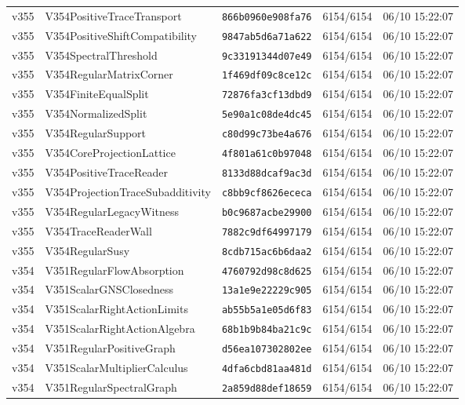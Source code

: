 \documentclass[11pt]{article}
\theoremstyle{definition}\newtheorem{deriv}{Derivation}
\begin{document}
{\begin{longtable}{@{}lllll@{}}
v355 & V354PositiveTraceTransport & \texttt{866b0960e908fa76} & 6154/6154 & 06/10 15:22:07 \\
v355 & V354PositiveShiftCompatibility & \texttt{9847ab5d6a71a622} & 6154/6154 & 06/10 15:22:07 \\
v355 & V354SpectralThreshold & \texttt{9c33191344d07e49} & 6154/6154 & 06/10 15:22:07 \\
v355 & V354RegularMatrixCorner & \texttt{1f469df09c8ce12c} & 6154/6154 & 06/10 15:22:07 \\
v355 & V354FiniteEqualSplit & \texttt{72876fa3cf13dbd9} & 6154/6154 & 06/10 15:22:07 \\
v355 & V354NormalizedSplit & \texttt{5e90a1c08de4dc45} & 6154/6154 & 06/10 15:22:07 \\
v355 & V354RegularSupport & \texttt{c80d99c73be4a676} & 6154/6154 & 06/10 15:22:07 \\
v355 & V354CoreProjectionLattice & \texttt{4f801a61c0b97048} & 6154/6154 & 06/10 15:22:07 \\
v355 & V354PositiveTraceReader & \texttt{8133d88dcaf9ac3d} & 6154/6154 & 06/10 15:22:07 \\
v355 & V354ProjectionTraceSubadditivity & \texttt{c8bb9cf8626ececa} & 6154/6154 & 06/10 15:22:07 \\
v355 & V354RegularLegacyWitness & \texttt{b0c9687acbe29900} & 6154/6154 & 06/10 15:22:07 \\
v355 & V354TraceReaderWall & \texttt{7882c9df64997179} & 6154/6154 & 06/10 15:22:07 \\
v355 & V354RegularSusy & \texttt{8cdb715ac6b6daa2} & 6154/6154 & 06/10 15:22:07 \\
v354 & V351RegularFlowAbsorption & \texttt{4760792d98c8d625} & 6154/6154 & 06/10 15:22:07 \\
v354 & V351ScalarGNSClosedness & \texttt{13a1e9e22229c905} & 6154/6154 & 06/10 15:22:07 \\
v354 & V351ScalarRightActionLimits & \texttt{ab55b5a1e05d6f83} & 6154/6154 & 06/10 15:22:07 \\
v354 & V351ScalarRightActionAlgebra & \texttt{68b1b9b84ba21c9c} & 6154/6154 & 06/10 15:22:07 \\
v354 & V351RegularPositiveGraph & \texttt{d56ea107302802ee} & 6154/6154 & 06/10 15:22:07 \\
v354 & V351ScalarMultiplierCalculus & \texttt{4dfa6cbd81aa481d} & 6154/6154 & 06/10 15:22:07 \\
v354 & V351RegularSpectralGraph & \texttt{2a859d88def18659} & 6154/6154 & 06/10 15:22:07 \\

\end{longtable}}
\end{document}
